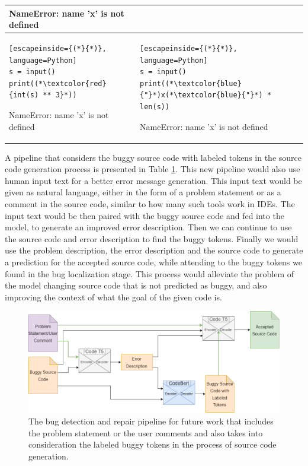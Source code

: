 \documentclass[12pt,a4paper]{report}
\begin{document}
\begin{appendices}
\begin{table}[H]
\begin{tabular}{p{7.5cm} p{7.5cm}}
NameError: name 'x' is not defined
\\

\hline
\begin{lstlisting}[escapeinside={(*}{*)}, language=Python]
s = input()
print((*\textcolor{red}{int(s) ** 3}*))
\end{lstlisting}

NameError: name 'x' is not defined & 
\begin{lstlisting}[escapeinside={(*}{*)}, language=Python]
s = input()
print((*\textcolor{blue}{"}*)x(*\textcolor{blue}{"}*) * len(s))
\end{lstlisting}

NameError: name 'x' is not defined
\\
\end{tabular}
\end{table}

A pipeline that considers the buggy source code with labeled tokens in the source code generation process is presented in Table \ref{fig:appendices1}. This new pipeline would also use human input text for a better error message generation. This input text would be given as natural language, either in the form of a problem statement or as a comment in the source code, similar to how many such tools work in IDEs. The input text would be then paired with the buggy source code and fed into the model, to generate an improved error description. Then we can continue to use the source code and error description to find the buggy tokens. Finally we would use the problem description, the error description and the source code to generate a prediction for the accepted source code, while attending to the buggy tokens we found in the bug localization stage. This process would alleviate the problem of the model changing source code that is not predicted as buggy, and also improving the context of what the goal of the given code is.

\begin{figure}[H]
\centering
\includegraphics[width=\textwidth]{pics/bug-model-future.png}
  \caption{The bug detection and repair pipeline for future work that includes the problem statement or the user comments and also takes into consideration the labeled buggy tokens in the process of source code generation.}
  \label{fig:appendices1}
\end{figure}


\end{appendices}
\end{document}
